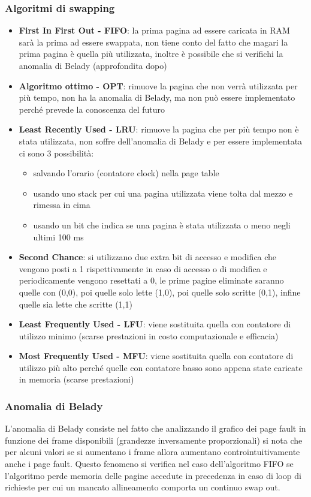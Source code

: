 \documentclass[a4paper]{article}
\begin{document}
\subsubsection*{Algoritmi di swapping}
\begin{itemize}
	\item \textbf{First In First Out - FIFO}: la prima pagina ad essere caricata in RAM sarà la prima ad essere swappata, non
	tiene conto del fatto che magari la prima pagina è quella più utilizzata, inoltre è possibile che si verifichi la anomalia
	di Belady (approfondita dopo)
	\item \textbf{Algoritmo ottimo - OPT}: rimuove la pagina che non verrà utilizzata per più tempo, non ha la anomalia di
	Belady, ma non può essere implementato perché prevede la conoscenza del futuro
	\item \textbf{Least Recently Used - LRU}: rimuove la pagina che per più tempo non è stata utilizzata, non soffre dell'anomalia
	di Belady e per essere implementata ci sono 3 possibilità:
	\begin{itemize}[topsep=0pt]
		\item salvando l'orario (contatore clock) nella page table
		\item usando uno stack per cui una pagina utilizzata viene tolta dal mezzo e rimessa in cima
		\item usando un bit che indica se una pagina è stata utilizzata o meno negli ultimi 100 ms
	\end{itemize}
	\item \textbf{Second Chance}: si utilizzano due extra bit di accesso e modifica che vengono posti a 1 rispettivamente in caso
	di accesso o di modifica e periodicamente vengono resettati a 0, le prime pagine eliminate saranno quelle con (0,0), poi quelle
	solo lette (1,0), poi quelle solo scritte (0,1), infine quelle sia lette che scritte (1,1)
	\item \textbf{Least Frequently Used - LFU}: viene sostituita quella con contatore di utilizzo minimo (scarse prestazioni in
	costo computazionale e efficacia)
	\item \textbf{Most Frequently Used - MFU}: viene sostituita quella con contatore di utilizzo più alto perché quelle con
	contatore basso sono appena state caricate in memoria (scarse prestazioni)
\end{itemize}

\subsubsection*{Anomalia di Belady}
L'anomalia di Belady consiste nel fatto che analizzando il grafico dei page fault in funzione dei frame disponibili (grandezze
inversamente proporzionali) si nota che per alcuni valori se si aumentano i frame allora aumentano controintuitivamente anche
i page fault. Questo fenomeno si verifica nel caso dell'algoritmo FIFO se l'algoritmo perde memoria delle pagine accedute in 
precedenza in caso di loop di richieste per cui un mancato allineamento comporta un continuo swap out.
\end{document}
